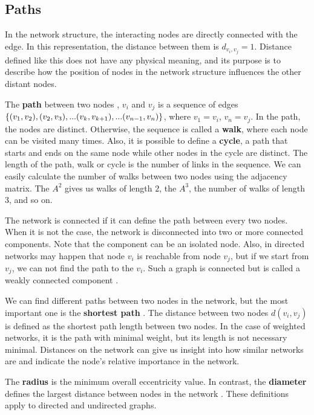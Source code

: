 \subsection{Paths} 
In the network structure, the interacting nodes are directly connected with the edge. In this representation, the distance between them is $d_{v_i, v_j} =1 $. Distance defined like this does not have any physical meaning, and its purpose is to describe how the position of nodes in the network structure influences the other distant nodes. 

The \textbf{path} between two nodes \cite{van2010graph}, $v_i$ and $v_j$ is a sequence of edges $\{(v_1, v_2),  (v_2, v_3), ...(v_k, v_{k+1})\\,... (v_{n-1}, v_n)\}$, where $v_1=v_i$, $v_n=v_j$. In the path, the nodes are distinct. Otherwise, the sequence is called a \textbf{walk}, where each node can be visited many times. Also, it is possible to define a \textbf{cycle}, a path that starts and ends on the same node while other nodes in the cycle are distinct. The length of the path, walk or cycle is the number of links in the sequence. We can easily calculate the number of walks between two nodes using the adjacency matrix. The $A^2$ gives us walks of length $2$, the $A^3$, the number of walks of length 3, and so on. 

The network is connected if it can define the path between every two nodes. When it is not the case, the network is disconnected into two or more connected components. Note that the component can be an isolated node. Also, in directed networks may happen that node $v_i$ is reachable from node $v_j$, but if we start from $v_j$, we can not find the path to the $v_i$. Such a graph is connected but is called a weakly connected component \cite{jackson2010social}.

We can find different paths between two nodes in the network, but the most important one is the \textbf{shortest path} \cite{van2010graph, jackson2010social}. The distance between two nodes $d(v_i, v_j)$ is defined as the shortest path length between two nodes. 
In the case of weighted networks, it is the path with minimal weight, but its length is not necessary minimal. Distances on the network can give us insight into how similar networks are and indicate the node's relative importance in the network. 

The \textbf{radius} is the minimum overall eccentricity value. In contrast, the \textbf{diameter} defines the largest distance between nodes in the network \cite{van2010graph}. These definitions apply to directed and undirected graphs. 

